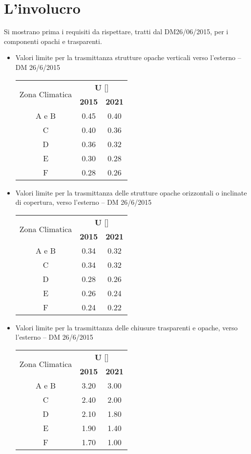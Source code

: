 \section{L'involucro}
Si mostrano prima i requisiti da rispettare, tratti dal DM26/06/2015, per i componenti opachi e trasparenti.
\begin{itemize}
\item Valori limite per la trasmittanza strutture opache verticali verso l'esterno -- DM 26/6/2015
\begin{center}
	\begin{tabular}{ccc}
	\multirow{2}{*}{Zona Climatica} & \multicolumn{2}{c}{\textbf{U} [\trasm]}	\\
	\cmidrule(lr){2-3}
	& \textbf{2015} & \textbf{2021}				\\
	\midrule
	A e B							&	0.45		&	0.40 					\\
	C								& 	0.40		&	0.36					\\
	D								&	0.36		&	0.32					\\
	E								&	0.30		&	0.28					\\
	F								&	0.28		&	0.26					\\
\end{tabular}
\end{center}

\newpage
\item Valori limite per la trasmittanza delle strutture opache orizzontali o inclinate di copertura, verso l'esterno -- DM 26/6/2015
\begin{center}
	\begin{tabular}{ccc}
		\multirow{2}{*}{Zona Climatica} & \multicolumn{2}{c}{\textbf{U} [\trasm]}	\\
		\cmidrule(lr){2-3}
		& \textbf{2015} & \textbf{2021}				\\
		\midrule
		A e B							&	0.34		&	0.32					\\
		C								& 	0.34		&	0.32					\\
		D								&	0.28		&	0.26					\\
		E								&	0.26		&	0.24					\\
		F								&	0.24		&	0.22					\\
	\end{tabular}
\end{center}
\item Valori limite per la trasmittanza delle chiusure trasparenti e opache, verso l'esterno -- DM 26/6/2015
\begin{center}
	\begin{tabular}{ccc}
		\multirow{2}{*}{Zona Climatica} & \multicolumn{2}{c}{\textbf{U} [\trasm]}	\\
		\cmidrule(lr){2-3}
		& \textbf{2015} & \textbf{2021}				\\
		\midrule
		A e B							&	3.20		&	3.00					\\
		C								& 	2.40		&	2.00					\\
		D								&	2.10		&	1.80					\\
		E								&	1.90		&	1.40					\\
		F								&	1.70		&	1.00					\\
	\end{tabular}
\end{center}
\end{itemize}
